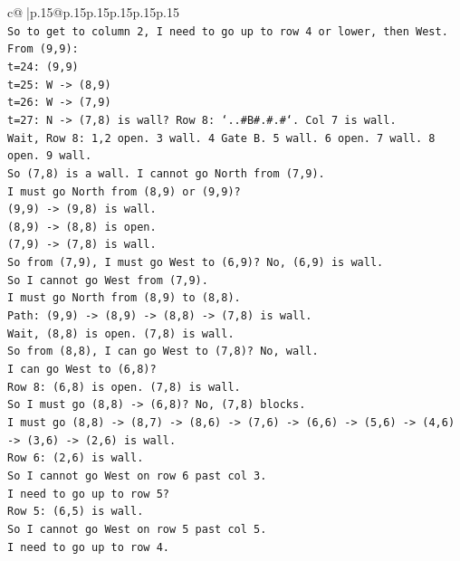 \documentclass{article}
\begin{document}
{\begin{supertabular}{c@{$\;$}|p{.15\linewidth}@{}p{.15\linewidth}p{.15\linewidth}p{.15\linewidth}p{.15\linewidth}p{.15\linewidth}}
{{{\\ 
\texttt{So to get to column 2, I need to go up to row 4 or lower, then West.} \\
\texttt{From (9,9):} \\
\texttt{t=24: (9,9)} \\
\texttt{t=25: W {-}> (8,9)} \\
\texttt{t=26: W {-}> (7,9)} \\
\texttt{t=27: N {-}> (7,8) is wall? Row 8: `..\#B\#.\#.\#`. Col 7 is wall.} \\
\texttt{Wait, Row 8: 1,2 open. 3 wall. 4 Gate B. 5 wall. 6 open. 7 wall. 8 open. 9 wall.} \\
\texttt{So (7,8) is a wall. I cannot go North from (7,9).} \\
\texttt{I must go North from (8,9) or (9,9)?} \\
\texttt{(9,9) {-}> (9,8) is wall.} \\
\texttt{(8,9) {-}> (8,8) is open.} \\
\texttt{(7,9) {-}> (7,8) is wall.} \\
\texttt{So from (7,9), I must go West to (6,9)? No, (6,9) is wall.} \\
\texttt{So I cannot go West from (7,9).} \\
\texttt{I must go North from (8,9) to (8,8).} \\
\texttt{Path: (9,9) {-}> (8,9) {-}> (8,8) {-}> (7,8) is wall.} \\
\texttt{Wait, (8,8) is open. (7,8) is wall.} \\
\texttt{So from (8,8), I can go West to (7,8)? No, wall.} \\
\texttt{I can go West to (6,8)?} \\
\texttt{Row 8: (6,8) is open. (7,8) is wall.} \\
\texttt{So I must go (8,8) {-}> (6,8)? No, (7,8) blocks.} \\
\texttt{I must go (8,8) {-}> (8,7) {-}> (8,6) {-}> (7,6) {-}> (6,6) {-}> (5,6) {-}> (4,6) {-}> (3,6) {-}> (2,6) is wall.} \\
\texttt{Row 6: (2,6) is wall.} \\
\texttt{So I cannot go West on row 6 past col 3.} \\
\texttt{I need to go up to row 5?} \\
\texttt{Row 5: (6,5) is wall.} \\
\texttt{So I cannot go West on row 5 past col 5.} \\
\texttt{I need to go up to row 4.} \\
}}}
\end{supertabular}}
\end{document}
